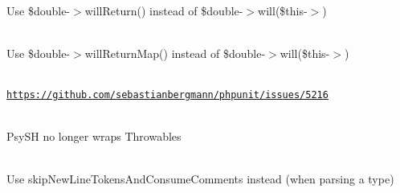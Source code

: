 \begin{DoxyRefList}
\item[Global \doxylink{class_p_h_p_unit_1_1_framework_1_1_test_case_a60066aad3cb7e880052466d619225d5b}{Test\+Case\+::return\+Value} (mixed \$value)]\hfill \\
\label{deprecated__deprecated000313}%
%
Use {\ttfamily \$double-\/\texorpdfstring{$>$}{>}will\+Return()} instead of {\ttfamily \$double-\/\texorpdfstring{$>$}{>}will(\$this-\/\texorpdfstring{$>$}{>})}  
\item[Global \doxylink{class_p_h_p_unit_1_1_framework_1_1_test_case_a01296977f98af86b301ee52ed691d9fa}{Test\+Case\+::return\+Value\+Map} (array \$value\+Map)]\hfill \\
\label{deprecated__deprecated000314}%
%
Use {\ttfamily \$double-\/\texorpdfstring{$>$}{>}will\+Return\+Map()} instead of {\ttfamily \$double-\/\texorpdfstring{$>$}{>}will(\$this-\/\texorpdfstring{$>$}{>})}  
\item[Global \doxylink{class_p_h_p_unit_1_1_framework_1_1_test_case_a11bdbe74bcbefb6494b296f016eccd25}{Test\+Case\+::set\+Locale} (mixed ... \$arguments)]\hfill \\
\label{deprecated__deprecated000320}%
%
\href{https://github.com/sebastianbergmann/phpunit/issues/5216}{\texttt{https\+://github.\+com/sebastianbergmann/phpunit/issues/5216}} 
\item[Global \doxylink{class_psy_1_1_exception_1_1_throw_up_exception_a95c0fd6d0d8d6d5a4b6c6966c961d000}{Throw\+Up\+Exception\+::from\+Throwable} (\$throwable)]\hfill \\
\label{deprecated__deprecated000336}%
%
Psy\+SH no longer wraps Throwables 
\item[Global \doxylink{class_p_h_p_stan_1_1_php_doc_parser_1_1_parser_1_1_token_iterator_ab860d661b11038f21c35545215abee4d}{Token\+Iterator\+::skip\+New\+Line\+Tokens} ()]\hfill \\
\label{deprecated__deprecated000286}%
%
Use skip\+New\+Line\+Tokens\+And\+Consume\+Comments instead (when parsing a type)  
\item[Class \doxylink{class_symfony_1_1_component_1_1_mailer_1_1_test_1_1_transport_factory_test_case}{Transport\+Factory\+Test\+Case} ]\hfill \\

\end{DoxyRefList}
